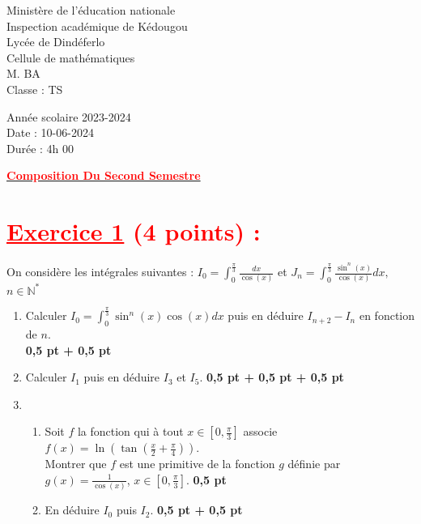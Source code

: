 \documentclass[12pt]{article}
\begin{document}
\begin{minipage}{0.5\textwidth}
	Ministère de l'éducation nationale  \\
	Inspection académique de Kédougou   \\
	Lycée de Dindéferlo            \\
	Cellule de mathématiques            \\
	M. BA                          \\
	Classe : TS  \\
\end{minipage}
\begin{minipage}{0.5\textwidth}
	Année scolaire 2023-2024 \\
	Date : 10-06-2024 \\
	Durée : 4h 00 \\
\end{minipage}

\begin{center}
	\textbf{{\underline{\textcolor{red}{Composition Du Second Semestre}}}}
\end{center}

\section*{\textcolor{red}{\underline{Exercice 1} (4 points) :}}
On considère les intégrales suivantes : $I_{0}=\int_{0}^{\frac{\pi}{3}} \frac{dx}{\cos (x)}$ et $J_{n}=\int_{0}^{\frac{\pi}{3}} \frac{\sin^{n}(x)}{\cos(x)}dx,$ $n \in \mathbb{N}^{*}$

\begin{enumerate}
    \item Calculer $I_{0}=\int_{0}^{\frac{\pi}{3}} \sin^{n}(x)\cos(x)dx$ puis en déduire $I_{n+2}-I_{n}$ en fonction de $n$.\\ \textbf{0,5 pt + 0,5 pt}
    \item Calculer $I_{1}$ puis en déduire $I_{3}$ et $I_{5}$. \textbf{0,5 pt + 0,5 pt + 0,5 pt}
    \item 
    \begin{enumerate}
        \item Soit $f$ la fonction qui à tout $x \in \left[0, \frac{\pi}{3}\right]$ associe $f(x) = \ln\left( \tan\left(\frac{x}{2}+\frac{\pi}{4}\right)\right)$.\\ Montrer que $f$ est une primitive de la fonction $g$ définie par $g(x) = \frac{1}{\cos(x)}$, $x \in \left[0, \frac{\pi}{3}\right]$. \textbf{0,5 pt}
        \item En déduire $I_{0}$ puis $I_{2}$. \textbf{0,5 pt + 0,5 pt}
    \end{enumerate}
\end{enumerate}
\end{document}
